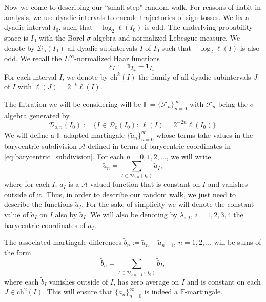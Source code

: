 \documentclass{amsart}
\newcommand{\cA}{\mathcal{A}}
\newcommand{\cD}{\mathcal{D}}
\newcommand{\cF}{\mathcal{F}}
\newcommand{\wt}{\widetilde}
\theoremstyle{definition}
\theoremstyle{remark}
\begin{document}
Now we come to describing our ``small step" random walk. For reasons of  habit in analysis, we use dyadic intervals to encode trajectories of sign tosses. We fix a dyadic interval $I_0$, such that $-\log_{2}\ell(I_0)$ is odd. The underlying probability space is $I_0$ with the Borel $\sigma$-algebra and normalized Lebesgue measure. We denote by $\cD_{\mathrm{o}}(I_0)$ all dyadic subintervals $I$ of $I_0$ such that $-\log_{2}\ell(I)$ is also odd. We recall the $L^{\infty}$-normalized Haar functions
\begin{equation*}
    \varepsilon_{I}:=\mathbf{1}_{I_+}-\mathbf{1}_{I_-}.
\end{equation*}
For each interval $I$, we denote by $\mathrm{ch}^k(I)$ the family of all dyadic subintervals $J$ of $I$ with $\ell(J)=2^{-k}\ell(I)$.

The filtration we will be considering will be $\mathbb{F}=\{\cF_n\}^{\infty}_{n=0}$ with $\cF_n$ being the $\sigma$-algebra generated by
\begin{equation*}
    \cD_{\mathrm{o},n}(I_0):=\{I\in\cD_{\mathrm{o}}(I_0):~\ell(I)=2^{-2n}\ell(I_0)\}.
\end{equation*}
We will define a $\mathbb{F}$-adapted martingale $\{\wt{a}_n\}_{n=0}^{\infty}$ whose terms take values in the barycentric subdivision $\cA$ defined in terms of barycentric coordinates in \eqref{eq:barycentric_subdivision}. For each $n=0,1,2,\ldots$, we will write
\begin{equation*}
    \wt{a}_n=\sum_{I\in\cD_{\mathrm{o},n}(I_0)}\wt{a}_{I},
\end{equation*}
where for each $I$, $\wt{a}_{I}$ is a $\cA$-valued function that is constant on $I$ and vanishes outside of it. Thus, in order to describe our random walk, we just need to describe the functions $\wt{a}_{I}$. For the sake of simplicity we will denote the constant value of $\wt{a}_{I}$ on $I$ also by $\wt{a}_{I}$. We will also be denoting by $\lambda_{i,I}$, $i=1,2,3,4$ the barycentric coordinates of $\wt{a}_{I}$.

The associated martingale differences $\wt{b}_n:=\wt{a}_{n}-\wt{a}_{n-1}$, $n=1,2,\ldots$ will be sums of the form
\begin{equation*}
    \wt{b}_n=\sum_{I\in\cD_{\mathrm{o},n-1}(I_0)}\wt{b}_{I},
\end{equation*}
where each $\wt{b}_{I}$ vanishes outside of $I$, has zero average on $I$ and is constant on each $J\in\mathrm{ch}^2(I)$. This will ensure that $\{\wt{a}_n\}^{\infty}_{n=0}$ is indeed a $\mathbb{F}$-martingale.
\end{document}
